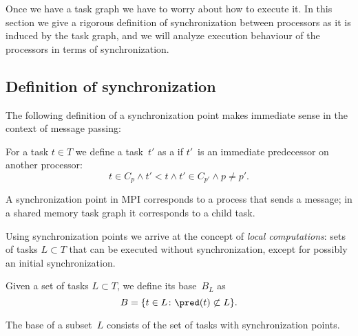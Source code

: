 
Once we have a task graph we have to worry about how to execute it.
In this section we give a rigorous definition of synchronization between processors
as it is induced by the task graph, and we will analyze execution behaviour
of the processors in terms of synchronization.

\subsection{Definition of synchronization}

The following definition of a synchronization point
makes immediate sense in the context of message passing:
\begin{definition}
  For a task $t\in T$ we define a task~$t'$ as a  if
  $t'$~is an immediate predecessor on another processor:
  \[ t\in C_p \wedge t'<t \wedge t'\in C_{p'} \wedge p\not=p'. \]
\end{definition}
A synchronization point in MPI corresponds to a process that sends a message; in a shared memory task
graph it corresponds to a child task.

Using synchronization points we arrive at the concept of \emph{local
  computations}: sets of tasks
$L\subset T$ that can be executed without synchronization, except for
possibly an initial synchronization. 

\begin{definition}
  Given a set of tasks $L\subset T$, we define its base~$B_L$ as
  \[ B = \{ t\in L\colon \pred(t)\not\subset L\}. \]
\end{definition}

The base of a subset~$L$ consists of the set of tasks with synchronization points.

